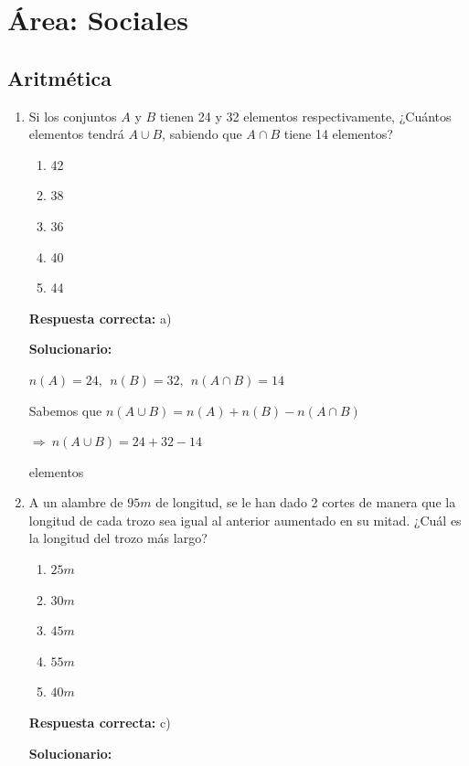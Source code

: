 \section*{Área: Sociales}


\subsection*{Aritmética}

\begin{enumerate}
	
	\item Si los conjuntos $A$ y $B$ tienen 24 y 32 elementos respectivamente, ¿Cuántos elementos tendrá $A\cup B$, sabiendo que $A\cap B$ tiene 14 elementos?
	\begin{enumerate}[label=\alph*)]
		\item 42
		\item 38
		\item 36
		\item 40
		\item 44
	\end{enumerate}
	\textbf{Respuesta correcta:} a)
	
	\vspace{2mm}
	\textbf{Solucionario:}\
	
	$n(A)=24,\ \ n(B)=32,\ \ n(A\cap B)=14$
	
	Sabemos que $n(A\cup B)=n(A)+n(B)-n(A\cap B)$
	
	$\Rightarrow\ n(A\cup B)=24+32-14$
	
	 elementos
	
	\vspace{6mm}
	
	\item A un alambre de $95m$ de longitud, se le han dado 2 cortes de manera que la longitud de cada trozo sea igual al anterior aumentado en su mitad. ¿Cuál es la longitud del trozo más largo?
	\begin{enumerate}[label=\alph*)]
		\item $25m$
		\item $30m$
		\item $45m$
		\item $55m$
		\item $40m$
	\end{enumerate}
	\textbf{Respuesta correcta:} c)
	
	\vspace{2mm}
	\textbf{Solucionario:}
	

\end{enumerate}
